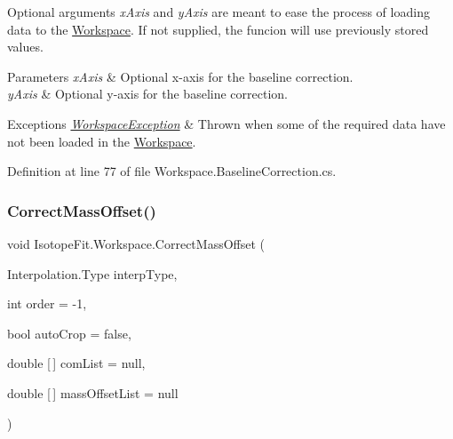Optional arguments {\itshape x\+Axis}  and {\itshape y\+Axis}  are meant to ease the process of loading data to the \hyperlink{class_isotope_fit_1_1_workspace}{Workspace}. If not supplied, the funcion will use previously stored values.


\begin{DoxyParams}{Parameters}
{\em x\+Axis} & Optional x-\/axis for the baseline correction.\\
\hline
{\em y\+Axis} & Optional y-\/axis for the baseline correction.\\
\hline
\end{DoxyParams}

\begin{DoxyExceptions}{Exceptions}
{\em \hyperlink{class_isotope_fit_1_1_workspace_exception}{Workspace\+Exception}} & Thrown when some of the required data have not been loaded in the \hyperlink{class_isotope_fit_1_1_workspace}{Workspace}.\\
\hline
\end{DoxyExceptions}


Definition at line 77 of file Workspace.\+Baseline\+Correction.\+cs.

\mbox{\label{class_isotope_fit_1_1_workspace_a188d75c84db3eb6b5c3812e44eb95695}} 
\subsubsection{\texorpdfstring{Correct\+Mass\+Offset()}{CorrectMassOffset()}}
{\footnotesize\ttfamily void Isotope\+Fit.\+Workspace.\+Correct\+Mass\+Offset (\begin{DoxyParamCaption}\item[{Interpolation.\+Type}]{interp\+Type,  }\item[{int}]{order = {\ttfamily -\/1},  }\item[{bool}]{auto\+Crop = {\ttfamily false},  }\item[{double \mbox{[}$\,$\mbox{]}}]{com\+List = {\ttfamily null},  }\item[{double \mbox{[}$\,$\mbox{]}}]{mass\+Offset\+List = {\ttfamily null} }\end{DoxyParamCaption})}



